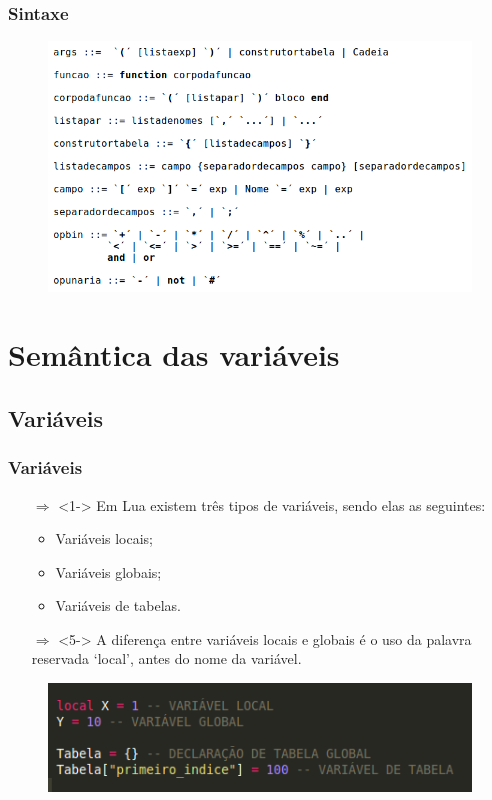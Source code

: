 \documentclass{beamer}
\begin{document}
\begin{frame}[fragile]
\frametitle{Sintaxe}
	\begin{figure}[!htb]
		\centering
		\includegraphics[width=1\linewidth]{imagens/sintaxe2}
	\end{figure}
\end{frame}

\section{Semântica das variáveis}
\subsection{Variáveis}
\begin{frame}[fragile]
\frametitle{Variáveis}
	\begin{itemize}
	\item [$\Rightarrow$]<1-> Em Lua existem três tipos de variáveis, sendo elas as seguintes:
	\begin{itemize}
		\item <2-> Variáveis locais;
		\item <3-> Variáveis globais;
		\item <4-> Variáveis de tabelas.
	\end{itemize}
	\item [$\Rightarrow$]<5-> A diferença entre variáveis locais e globais é o uso da palavra reservada ‘local’, antes do nome da variável.
	\end{itemize}
	\begin{figure}[!htb]
		\centering
		\includegraphics[width=0.7\linewidth]{imagens/variaveis}
	\end{figure}
\end{frame}
\end{document}
